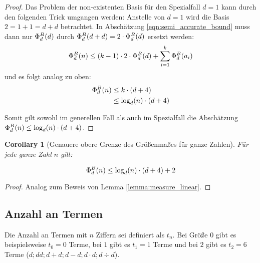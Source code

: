 \documentclass{article}
\newtheorem{corollary}{Corollary}[theorem]
\theoremstyle{nonumberplain}
\newtheorem{proof}{Beweis}
\begin{document}
\begin{proof}
Das Problem der non-existenten Basis für den Spezialfall \(d = 1\) kann durch den folgenden Trick umgangen werden:
Anstelle von \(d = 1\) wird die  Basis \(2 = 1 + 1 = d + d\) betrachtet.   
In Abschätzung \ref{eqn:semi_accurate_bound} muss dann nur \(\Phi_{d}^{B}(d)\) durch \(\Phi_{d}^{B}(d + d) = 2\cdot\Phi_{d}^{B}(d)\) ersetzt werden:
    \[\Phi_{d}^{B}(n) \leq (k-1) \cdot 2 \cdot \Phi_{d}^{B}(d) + \sum_{i=1}^k \Phi_{d}^{B}(a_i)\]
und es folgt analog zu oben:
    \begin{align*}
        \Phi_{d}^{B}(n) 
        &\leq k \cdot (d+4) \\
        &\leq \log_d(n) \cdot (d+4) \\
    \end{align*}

Somit gilt sowohl im generellen Fall als auch im Spezialfall die Abschätzung \(\Phi_{d}^{B}(n) \leq \log_d(n) \cdot (d+4)\).
\end{proof}

\begin{corollary}[Genauere obere Grenze des Größenmaßes für ganze Zahlen]\label{corollary:phi_bound}
    Für jede ganze Zahl \(n\) gilt:
    
        \[\Phi_{d}^{B}(n) \leq \log_d(n) \cdot (d+4) + 2\]
\end{corollary}
\begin{proof}
    Analog zum Beweis von Lemma \ref{lemma:measure_linear}.
\end{proof}

\subsection{Anzahl an Termen}

Die Anzahl an Termen mit \(n\) Ziffern sei definiert als \(t_n\).
Bei Größe \(0\) gibt es beispielsweise \(t_0 = 0\) Terme, bei \(1\) gibt es \(t_1 = 1\) Terme und bei \(2\) gibt es \(t_2 = 6\) Terme (\(d; dd; d+d; d-d; d \cdot d; d \div d\)).
\end{document}
